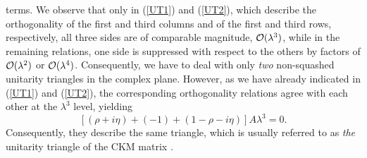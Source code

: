 \documentclass[12pt]{article}
\begin{document}
terms. We observe that only in (\ref{UT1}) and (\ref{UT2}), which 
describe the orthogonality of the first and third columns 
and of the first and third rows, respectively, all three sides are 
of comparable magnitude, ${\cal O}(\lambda^3)$, while in the 
remaining relations, one side is suppressed with respect to the others 
by factors of ${\cal O}(\lambda^2)$ or ${\cal O}(\lambda^4)$. Consequently,
we have to deal with only {\it two} non-squashed unitarity triangles 
in the complex plane. However, as we have already indicated in (\ref{UT1}) 
and (\ref{UT2}), the corresponding orthogonality relations agree with each 
other at the $\lambda^3$ level, yielding
\begin{equation}\label{UTLO}
\left[(\rho+i\eta)+(-1)+(1-\rho-i\eta)\right]A\lambda^3=0.
\end{equation}
Consequently, they describe the same triangle, which is usually referred 
to as {\it the} unitarity triangle of the CKM matrix 
\cite{JS,ut}.
\end{document}
